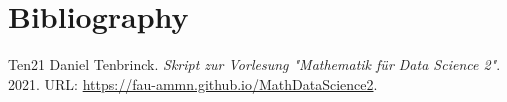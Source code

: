 \chapter{Bibliography}
\label{\detokenize{references:bibliography}}\label{\detokenize{references::doc}}


\begin{sphinxthebibliography}{Ten21}
Daniel Tenbrinck. \emph{Skript zur Vorlesung "Mathematik für Data Science 2"}. 2021. URL: \url{https://fau-ammn.github.io/MathDataScience2}.
\end{sphinxthebibliography}






\renewcommand{\indexname}{Proof Index}


\renewcommand{\indexname}{Index}

